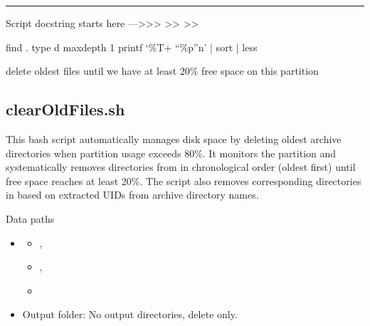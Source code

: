 \documentclass[letterpaper,10pt,english]{sphinxmanual}
\begin{document}
\bigskip\hrule\bigskip


\sphinxAtStartPar
Script docstring starts here —\textgreater{}\textgreater{}\textgreater{}
\textendash{}\textgreater{}\textgreater{}
\textendash{}\textgreater{}\textgreater{}

\sphinxAtStartPar
find . \sphinxhyphen{}type d \sphinxhyphen{}maxdepth 1 \sphinxhyphen{}printf ‘\%T+ “\%p”n’ | sort | less

\sphinxAtStartPar
delete oldest files until we have at least 20\% free space on this partition

\sphinxstepscope


\subsection{clearOldFiles.sh}
\label{\detokenize{Architecture/scripts/clearOldFiles:clearoldfiles-sh}}\label{\detokenize{Architecture/scripts/clearOldFiles::doc}}
\sphinxAtStartPar
This bash script automatically manages disk space by deleting oldest archive directories when partition usage exceeds 80\%. It monitors the  partition and systematically removes directories from  in chronological order (oldest first) until free space reaches at least 20\%. The script also removes corresponding directories in  based on extracted UIDs from archive directory names.

\sphinxAtStartPar
{}


\sphinxAtStartPar
{}


\sphinxAtStartPar
Data paths
\begin{itemize}
\item {} \begin{description}
\begin{itemize}
\item {} 
\sphinxAtStartPar
{},

\item {} 
\sphinxAtStartPar
{},

\item {} 
\sphinxAtStartPar
{}

\end{itemize}

\end{description}

\item {} 
\sphinxAtStartPar
Output folder: No output directories, delete only.

\end{itemize}
\end{document}
